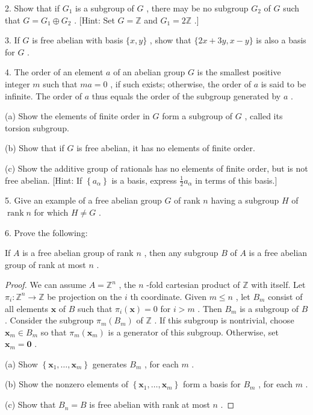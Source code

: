 2. Show that if \({G}_{1}\) is a subgroup of \(G\) , there may be no subgroup \({G}_{2}\) of \(G\) such that \(G = {G}_{1} \oplus  {G}_{2}\) . [Hint: Set \(G = \mathbb{Z}\) and \({G}_{1} = 2\mathbb{Z}\) .]

3. If \(G\) is free abelian with basis \(\{ x,y\}\) , show that \(\{ {2x} + {3y},x - y\}\) is also a basis for \(G\) .

4. The order of an element \(a\) of an abelian group \(G\) is the smallest positive integer \(m\) such that \({ma} = 0\) , if such exists; otherwise, the order of \(a\) is said to be infinite. The order of \(a\) thus equals the order of the subgroup generated by \(a\) .

(a) Show the elements of finite order in \(G\) form a subgroup of \(G\) , called its torsion subgroup.

(b) Show that if \(G\) is free abelian, it has no elements of finite order.

(c) Show the additive group of rationals has no elements of finite order, but is not free abelian. [Hint: If \(\left\{  {a}_{\alpha }\right\}\) is a basis, express \(\frac{1}{2}{a}_{\alpha }\) in terms of this basis.]

5. Give an example of a free abelian group \(G\) of rank \(n\) having a subgroup \(H\) of \(\operatorname{rank}n\) for which \(H \neq  G\) .

6. Prove the following:

\begin{theorem} If \(A\) is a free abelian group of rank \(n\) , then any subgroup \(B\) of \(A\) is a free abelian group of rank at most \(n\) .
\end{theorem}

\begin{proof}We can assume \(A = {\mathbb{Z}}^{n}\) , the \(n\) -fold cartesian product of \(\mathbb{Z}\) with itself. Let \({\pi }_{i} : {\mathbb{Z}}^{n} \rightarrow  \mathbb{Z}\) be projection on the \(i\) th coordinate. Given \(m \leq  n\) , let \({B}_{m}\) consist of all elements \(\mathbf{x}\) of \(B\) such that \({\pi }_{i}\left( \mathbf{x}\right)  = 0\) for \(i > m\) . Then \({B}_{m}\) is a subgroup of \(B\) .
Consider the subgroup \({\pi }_{m}\left( {B}_{m}\right)\) of \(\mathbb{Z}\) . If this subgroup is nontrivial, choose \({\mathbf{x}}_{m} \in  {B}_{m}\) so that \({\pi }_{m}\left( {\mathbf{x}}_{m}\right)\) is a generator of this subgroup. Otherwise, set \({\mathbf{x}}_{m} = \mathbf{0}\) .

(a) Show \(\left\{  {{\mathbf{x}}_{1},\ldots ,{\mathbf{x}}_{m}}\right\}\) generates \({B}_{m}\) , for each \(m\) .

(b) Show the nonzero elements of \(\left\{  {{\mathbf{x}}_{1},\ldots ,{\mathbf{x}}_{m}}\right\}\) form a basis for \({B}_{m}\) , for each \(m\) .

(c) Show that \({B}_{n} = B\) is free abelian with rank at most \(n\) .
\end{proof}
